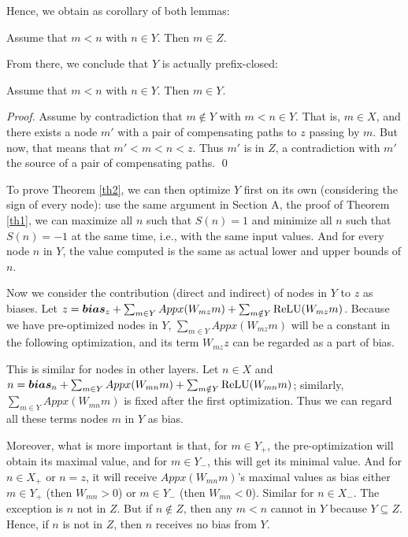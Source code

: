 Hence, we obtain as corollary of both lemmas:

\begin{corollary}
\label{cor:simple}
Assume that $m < n$ with $n \in Y$.
Then $m \in Z$.
\end{corollary}

From there, we conclude that $Y$ is actually prefix-closed:

\begin{lemma}
	\label{lemma12}
	Assume that $m < n$ with $n \in Y$.
	Then $m \in Y$.
\end{lemma}

\begin{proof}
Assume by contradiction that $m \notin Y$ with $m<n \in Y$.
That is, $m \in X$, and there exists a node $m'$ with a pair of compensating paths to $z$
passing by $m$. But now, that means that $m'<m<n<z$.
Thus $m'$ is in $Z$, a contradiction with $m'$ the source of a pair of compensating paths.
\qed
\end{proof}

To prove Theorem \ref{th2}, we can then optimize $Y$ first on its own (considering the sign of every node): use the same argument in Section A, the proof of Theorem \ref{th1}, we can maximize all $n$ such that $S(n)=1$ and minimize all $n$ such that $S(n)=-1$ at the same time, i.e., with the same input values. And for every node $n$ in $Y$, the value computed is the same as actual lower and upper bounds of $n$.


Now we consider the contribution  (direct and indirect) of nodes in $Y$ to $z$ as biases. Let $z=\boldsymbol{bias}_z+\sum_{m\in Y} Appx(W_{mz}m)+\sum_{m\notin Y} \mathrm{ReLU}(W_{mz}m)$. Because we have pre-optimized nodes in $Y$, $\sum_{m\in Y} Appx(W_{mz}m)$ will be a constant in the following optimization, and its term $W_{mz}z$ can be regarded as a part of bias. 

This is similar for nodes in other layers. Let $n\in X$ and $n=\boldsymbol{bias}_n+\sum_{m\in Y} Appx(W_{mn}m)+\sum_{m\notin Y} \mathrm{ReLU}(W_{mn}m)$; similarly, $\sum_{m\in Y}Appx(W_{mn}m)$ is fixed after the first optimization. Thus we can regard all these terms nodes $m$ in $Y$ as bias.



Moreover, what is more important is that,  for $m\in Y_+$, the pre-optimization will obtain its maximal value, and for $m\in Y_-$, this will get its minimal value. And for $n\in X_+$ or $n=z$, it will receive $Appx(W_{mn}m)$'s maximal values as bias either $m\in Y_+$ (then $W_{mn}>0$) or $m\in Y_-$ (then $W_{mn}<0$). Similar for $n\in X_-$. The exception is $n$ not in $Z$. But if $n\notin Z$, then any $m<n$ cannot in $Y$ because $Y\subseteq Z$.   Hence, if $n$ is not in $Z$, then $n$ receives no bias from $Y$.



